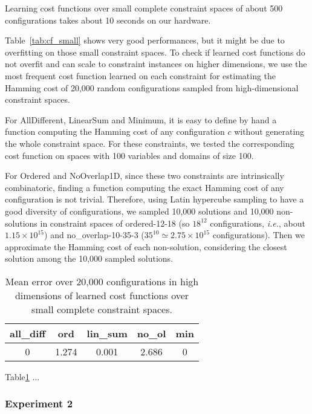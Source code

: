 \documentclass{article}
\newcommand{\ie}{\textit{i.e.}}
\begin{document}
Learning cost functions over small complete constraint spaces of about
500 configurations takes about 10 seconds on our hardware.

Table~\ref{tab:cf_small} shows very good performances, but it might be
due  to overfitting  on those  small constraint  spaces.  To  check if
learned  cost functions  do not  overfit and  can scale  to constraint
instances on higher dimensions, we use the most frequent cost function
learned on each  constraint for estimating the Hamming  cost of 20,000
random configurations sampled from high-dimensional constraint spaces.

For AllDifferent, LinearSum and Minimum, it  is easy to define by hand
a function computing the Hamming cost of any configuration $c$ without
generating  the  whole constraint  space.  For  these constraints,  we
tested the  corresponding cost function  on spaces with  100 variables
and domains of size 100.

For  Ordered   and  NoOverlap1D,  since  these   two  constraints  are
intrinsically  combinatoric, finding  a function  computing the  exact
Hamming cost  of any configuration  is not trivial.   Therefore, using
Latin hypercube sampling  to have a good  diversity of configurations,
we  sampled 10,000  solutions and  10,000 non-solutions  in constraint
spaces  of  ordered-12-18  (so $18^{12}$  configurations,  \ie,  about
$1.15\times         10^{15}$)          and         no\_overlap-10-35-3
($35^{10}  \simeq   2.75\times  10^{15}$  configurations).    Then  we
approximate  the Hamming  cost of  each non-solution,  considering the
closest solution among the 10,000 sampled solutions.

\begin{table}
  \centering
\begin{tabular}{|c|c|c|c|c|}
  \hline
  all\_diff & ord & lin\_sum & no\_ol & min\\
  \hline
  0 & 1.274 & 0.001 & 2.686 & 0\\
  \hline
\end{tabular}
\caption{Mean error  over 20,000 configurations in  high dimensions of
  learned cost functions over small complete constraint spaces.}
\label{tab:cf_scale}
\end{table}

Table\ref{tab:cf_scale} ...

\subsubsection{Experiment 2}
\end{document}
